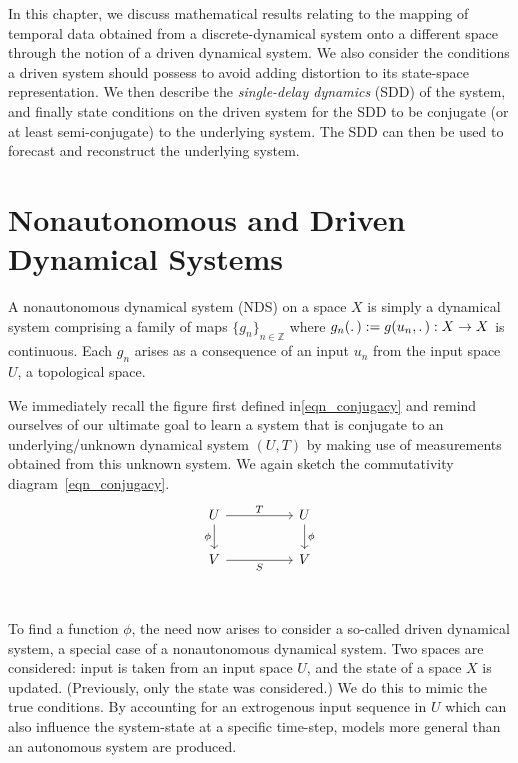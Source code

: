In this chapter, we discuss mathematical results relating to the mapping of temporal data obtained from a discrete-dynamical system onto a different space through the notion of a driven dynamical system. 
We also consider the conditions a driven system should possess to avoid adding distortion to its state-space representation. 
We then describe the \emph{single-delay dynamics} (SDD) of the system, and finally state conditions on the driven system for the SDD to be conjugate (or at least semi-conjugate) to the underlying system. 
The SDD can then be used to forecast and reconstruct the underlying system. 

\section{Nonautonomous and Driven Dynamical Systems}

\begin{Definition}
  \label{Dfn_NDS}\rm
  A nonautonomous dynamical system (NDS) on a space $X$ is simply a dynamical system comprising a family of maps ${\{g_n\}}_{n \in \mathbb{Z}}$ where $g_n(\ldotp):=g(u_n,\ldotp):X\to{X}$ is continuous. Each $g_n$ arises as a consequence of an input $u_n$ from the input space $U$, a topological space. 
\end{Definition}

We immediately recall the figure first defined in\eqref{eqn_conjugacy}  and remind ourselves of our ultimate goal to learn a system that is conjugate to an underlying/unknown dynamical system $(U,T)$ by making use of measurements obtained from  this unknown system. 
We again sketch the commutativity diagram~\ref{eqn_conjugacy}.
\begin{equation*}\label{UV_conjugacy}
  \begin{tikzcd}
    U && U \\
    V && V \\
    \arrow["T", from=1-1, to=1-3]
    \arrow["\phi", from=1-3, to=2-3]
    \arrow["\phi"', from=1-1, to=2-1]
    \arrow["S"', from=2-1, to=2-3]
  \end{tikzcd}
  \end{equation*}

To find a function $\phi$, the need now arises to consider a so-called driven dynamical system, a special case of a nonautonomous dynamical system. 
Two spaces are considered: input is taken from an input space $U$, and the state of a space $X$ is updated. (Previously, only the state was considered.)
We do this to mimic the true conditions. By accounting for an extrogenous input sequence in $U$ which can also influence the  system-state at a specific time-step, models more general than an autonomous system are produced.

